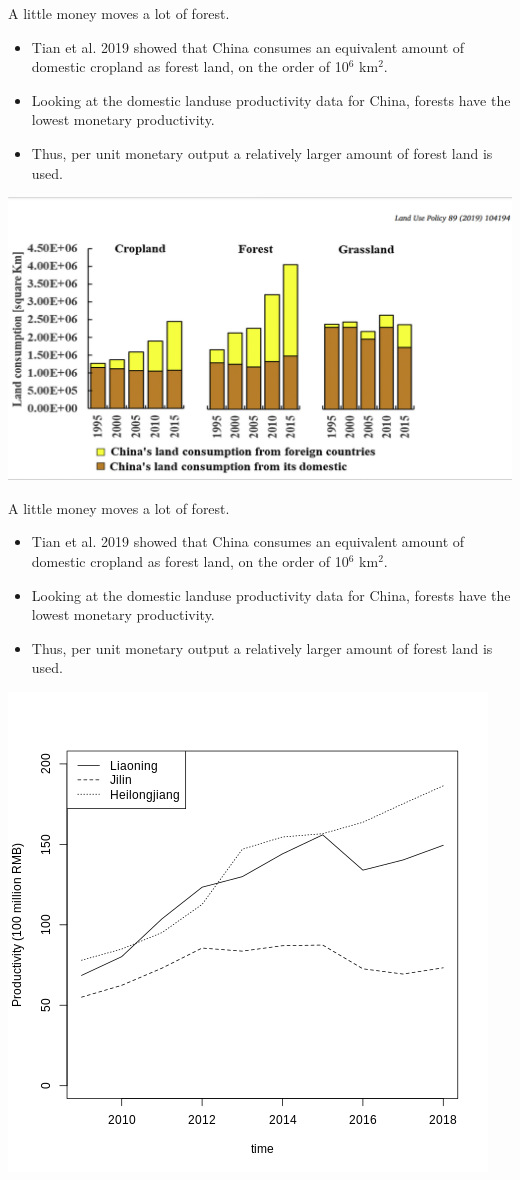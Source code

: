 \documentclass[ignorenonframetext,]{beamer}
\providecommand{\tightlist}{%
  \setlength{\itemsep}{0pt}\setlength{\parskip}{0pt}}
\begin{document}
\begin{frame}{A little money moves a lot of forest.}

\begin{itemize}
\tightlist
\item
  Tian et al. 2019 showed that China consumes an equivalent amount of
  domestic cropland as forest land, on the order of 10\(^6\) km\(^2\).
\item
  Looking at the domestic landuse productivity data for China, forests
  have the lowest monetary productivity.
\item
  Thus, per unit monetary output a relatively larger amount of forest
  land is used.
\end{itemize}

\begin{center}\includegraphics[width=0.5\linewidth]{images/Tian_2019_Fig1} \end{center}

\end{frame}

\begin{frame}{A little money moves a lot of forest.}

\begin{itemize}
\tightlist
\item
  Tian et al. 2019 showed that China consumes an equivalent amount of
  domestic cropland as forest land, on the order of 10\(^6\) km\(^2\).
\item
  Looking at the domestic landuse productivity data for China, forests
  have the lowest monetary productivity.
\item
  Thus, per unit monetary output a relatively larger amount of forest
  land is used.
\end{itemize}

\begin{center}\includegraphics[width=0.5\linewidth]{images/prod_for_time_nec} \end{center}

\end{frame}
\end{document}
